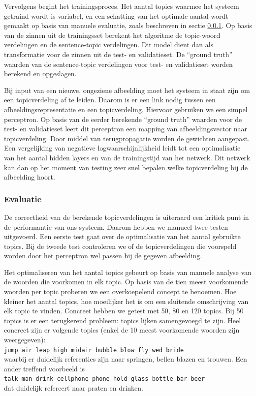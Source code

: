 Vervolgens begint het trainingsproces. Het aantal topics waarmee het systeem getraind wordt is variabel, en een schatting van het optimale aantal wordt gemaakt op basis van manuele evaluatie, zoals beschreven in sectie \ref{subs:Evaluatie}. Op basis van de zinnen uit de trainingsset berekent het algoritme de topic-woord verdelingen en de sentence-topic verdelingen. Dit model dient dan als transformatie voor de zinnen uit de test- en validatieset. De ``ground truth'' waarden van de sentence-topic verdelingen voor test- en validatieset worden berekend en opgeslagen.

Bij input van een nieuwe, ongeziene afbeelding moet het systeem in staat zijn om een topicverdeling af te leiden. Daarom is er een link nodig tussen een afbeeldingsrepresentatie en een topicverdeling. Hiervoor gebruiken we een simpel perceptron. Op basis van de eerder berekende ``ground truth'' waarden voor de test- en validatieset leert dit perceptron een mapping van afbeeldingsvector naar topicverdeling. Door middel van terugpropagatie worden de gewichten aangepast. Een vergelijking van negatieve logwaarschijnlijkheid leidt tot een optimalisatie van het aantal hidden layers en van de trainingstijd van het netwerk. Dit netwerk kan dan op het moment van testing zeer snel bepalen welke topicverdeling bij de afbeelding hoort.

\subsubsection{Evaluatie}
\label{subs:Evaluatie}
De correctheid van de berekende topicverdelingen is uiteraard een kritiek punt in de performantie van ons systeem. Daarom hebben we manueel twee testen uitgevoerd. Een eerste test gaat over de optimalisatie van het aantal gebruikte topics. Bij de tweede test controleren we of de topicverdelingen die voorspeld worden door het perceptron wel passen bij de gegeven afbeelding.

Het optimaliseren van het aantal topics gebeurt op basis van manuele analyse van de woorden die voorkomen in elk topic. Op basis van de tien meest voorkomende woorden per topic proberen we een overkoepelend concept te benoemen. Hoe kleiner het aantal topics, hoe moeilijker het is om een sluitende omschrijving van elk topic te vinden. Concreet hebben we getest met 50, 80 en 120 topics. Bij 50 topics is er een terugkerend probleem: topics lijken samengevoegd te zijn. Heel concreet zijn er volgende topics (enkel de 10 meest voorkomende woorden zijn weergegeven): \\
\texttt{jump air leap high midair bubble blow fly wed bride}
\\
waarbij er duidelijk referenties zijn naar springen, bellen blazen en trouwen. Een ander treffend voorbeeld is \\
\texttt{talk man drink cellphone phone hold glass bottle bar beer}
\\ dat duidelijk refereert naar praten en drinken.

